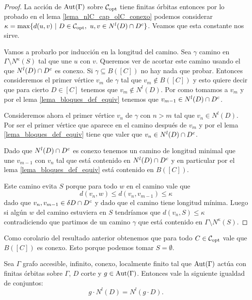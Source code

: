 \documentclass[tesis.tex]{subfiles}
\begin{document}
\begin{proof}
	La acción de $\text{Aut}(\Gamma)$ sobre ${\cal C}_{\text{opt}}$ tiene finitas órbitas entonces por lo probado en el lema \ref{lema_nlC_cap_olC_conexo} podemos considerar 
	$\kappa = \max \{ d(u,v) \ | \ D \in \copt, \  u,v \in N^l(D) \cap \olc D  \}$. 	
	Veamos que esta constante nos sirve.
	
	Vamos a probarlo por inducción en la longitud del camino.
	Sea $\gamma$ camino en $\Gamma \setminus N^{\kappa}(S)$ tal que une $u$ con $v$.
	Queremos ver de acortar este camino usando el  que $N^{l}(D) \cap D^{c}$ es conexo.
	Si $\gamma \subseteq B([C])$ no hay nada que probar.
	Entonces consideremos el primer vértice $v_m$ de $\gamma$ tal que $v_m \notin B([C])$ y esto quiere decir que para cierto $D \in [C]$ tenemos que $v_m \notin N^l(D)$.
	Por como tomamos a $v_{m}$ y por el lema \ref{lema_bloques_def_equiv} tenemos que $v_{m-1} \in N^l(D) \cap D^{c}$.
	
		
	Consideremos ahora el primer vértice $v_n$ de $\gamma$ con $n > m$ tal que $v_n \in N^l(D)$.
	Por ser el primer vértice que aparece en el camino después de $v_{m}$ y por el lema \ref{lema_bloques_def_equiv} tiene que valer que $v_n \in N^l(D) \cap D^{c}$.
	
	Dado que $N^l(D) \cap D^{c}$ es conexo tenemos un camino de longitud minimal que une $v_{m-1}$ con $v_n$ tal que está contenido en $N^l(D) \cap D^{c}$ y en particular por el lema \ref{lema_bloques_def_equiv} está contenido en $B([C])$.
	
	Este camino evita $S$ porque para todo $w$ en el camino vale que 
	\[
		d(v_{n},w) \le d(v_{n},v_{m-1}) \le \kappa
	\]
	dado que $v_{n}, v_{m-1} \in \delta D \cap D^{c}$ y dado que el camino tiene longitud mínima.
	Luego si algún $w$ del camino estuviera en $S$ tendríamos que 
	$d(v_n,S) \le \kappa$ contradiciendo que partimos de un camino $\gamma$ que está contenido en $\Gamma \setminus N^{\kappa}(S)$.	
	
\end{proof}


\begin{obs}
	Como corolario del resultado anterior obtenemos que para todo $C \in {\cal C}_{\text{opt}}$ vale que $B([C])$ es conexo.
	Esto porque podemos tomar $S = \emptyset$.
\end{obs}

\begin{lema}\label{lema_accion_vecinos}
	Sea $\Gamma$ grafo accesible, infinito, conexo, localmente finito tal que $\text{Aut}(\Gamma)$ actúa con finitas órbitas sobre $\Gamma$, $D$ corte y $g \in \text{Aut}(\Gamma)$. 
	Entonces vale la siguiente igualdad de conjuntos:
	\[
		g \cdot N^l(D) = N^l(g \cdot D).
	\]
\end{lema}
\end{document}
